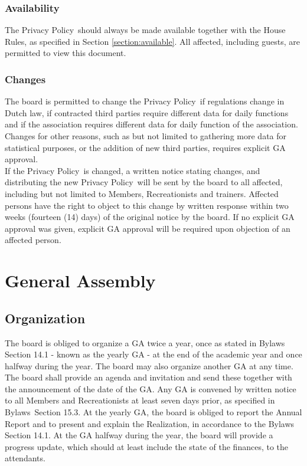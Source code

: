 \documentclass[a4paper]{article}
\newcommand{\Asta}{Bylaws} %
\newcommand{\Ahr}{House Rules} %
\newcommand{\Ajv}{Annual Report} %
\newcommand{\App}{Privacy Policy}
\begin{document}
\subsubsection{Availability}
The \App\ should always be made available together with the { \Ahr}, as specified in Section \ref{section:available}. All affected, including { guests}, are permitted to view this document.

\subsubsection{Changes}
The board is permitted to change the \App\ if regulations change in Dutch law, if contracted third parties require different data for daily functions and if the association requires different data for daily function of the association. Changes for other reasons, such as but not limited to gathering more data for statistical purposes, or the addition of new third parties, requires explicit { GA} approval. \\

If the \App\ is changed, a written notice stating changes, and distributing the new \App\ will be sent by the board to all affected, including but not limited to { Members}, { Recreationists} and trainers. Affected persons have the right to object to this change by written response within two weeks (fourteen (14) days) of the original notice by the board. If no explicit { GA} approval was given, explicit { GA} approval will be required upon objection of an affected person.


\section{General Assembly}
\subsection{Organization}
\label{section:yearlyGA}
The board is obliged to organize a { GA} twice a year, once as stated in { \Asta} Section 14.1 - known as the yearly { GA} - at the end of the academic year and once halfway during the year. The board may also organize another { GA} at any time. The board shall provide an agenda and invitation and send these together with the announcement of the date of the { GA}. Any { GA} is convened by written notice to all { Members} and { Recreationists} at least seven days prior, as specified in \Asta\ Section 15.3. At the yearly { GA}, the board is obliged to report the { \Ajv} and to present and explain the Realization, in accordance to the { \Asta} Section 14.1. At the { GA} halfway during the year, the board will provide a progress update, which should at least include the state of the finances, to the attendants. \\
\end{document}
